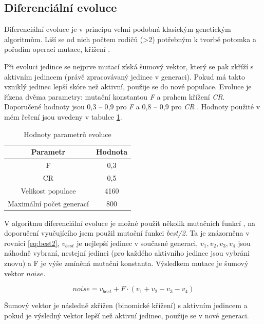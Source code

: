 \documentclass[11pt,a4paper]{scrartcl}
\begin{document}
	\subsection{Diferenciální evoluce}
	Diferenciální evoluce je v principu velmi podobná klasickým genetickým algoritmům. Liší se od nich počtem rodičů (\textgreater2) potřebným k tvorbě potomka a pořadím operací mutace, křížení \cite{hlavacek_de}. 
	
	Při evoluci jedince se nejprve mutací získá šumový vektor, který se pak zkříží s aktivním jedincem (právě zpracovávaný jedinec v generaci). Pokud má takto vzniklý jedinec lepší skóre než aktivní, použije se do nové populace. Evoluce je řízena dvěma parametry: mutační konstantou \textit{F} a prahem křížení \textit{CR}. Doporučené hodnoty jsou 0,3 -- 0,9 pro \textit{F} a 0,8 -- 0,9 pro \textit{CR} \cite{hlavacek_de}. Hodnoty použité v mém řešení jsou uvedeny v tabulce \ref{tab:param-val}.
	
	\begin{table}[H]
		\begin{center}	
			\begin{tabular}{|c|c|}
				\hline
				Parametr & Hodnota \\
				\hline
				\hline
				F & 0,3 \\
				\hline
				CR & 0,5 \\
				\hline 
				Velikost populace & 4160 \\
				\hline
				Maximální počet generací & 800 \\
				\hline
			\end{tabular}
		\end{center}
		\caption{Hodnoty parametrů evoluce}
		\label{tab:param-val}
	\end{table}
	
	V algoritmu diferenciální evoluce je možné použít několik mutačních funkcí \cite{hlavacek_de}, na doporučení vyučujícího jsem použil mutační funkci \textit{best/2}. Ta je znázorněna v rovnici \ref{eq:best2}, $v_{best}$ je nejlepší jedinec v současné generaci, $v_1,v_2,v_3,v_4$ jsou náhodně vybraní, nestejní jedinci (pro každého aktivního jedince jsou vybráni znovu) a F je výše zmíněná mutační konstanta. Výsledkem mutace je šumový vektor $noise$. 
	
	\begin{equation}
		noise = v_{best} + F\cdot(v_1+v_2-v_3-v_4)
		\label{eq:best2}
	\end{equation}
	
		Šumový vektor je následně zkřížen (binomické křížení) s aktivním jedincem a pokud je výsledný vektor lepší než aktivní jedinec, použije se v nové generaci.
	
\end{document}
